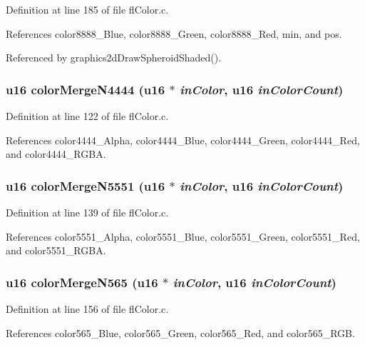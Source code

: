 Definition at line 185 of file fl\-Color.c.

References color8888\_\-Blue, color8888\_\-Green, color8888\_\-Red, min, and pos.

Referenced by graphics2d\-Draw\-Spheroid\-Shaded().
\subsubsection{\setlength{\rightskip}{0pt plus 5cm}u16 color\-Merge\-N4444 (u16 $\ast$ {\em in\-Color}, u16 {\em in\-Color\-Count})}\label{flColor_8c_9061458880496c59dbb038847f691c21}




Definition at line 122 of file fl\-Color.c.

References color4444\_\-Alpha, color4444\_\-Blue, color4444\_\-Green, color4444\_\-Red, and color4444\_\-RGBA.
\subsubsection{\setlength{\rightskip}{0pt plus 5cm}u16 color\-Merge\-N5551 (u16 $\ast$ {\em in\-Color}, u16 {\em in\-Color\-Count})}\label{flColor_8c_bb41f344d97f285f6e39ae0e931e3b80}




Definition at line 139 of file fl\-Color.c.

References color5551\_\-Alpha, color5551\_\-Blue, color5551\_\-Green, color5551\_\-Red, and color5551\_\-RGBA.
\subsubsection{\setlength{\rightskip}{0pt plus 5cm}u16 color\-Merge\-N565 (u16 $\ast$ {\em in\-Color}, u16 {\em in\-Color\-Count})}\label{flColor_8c_7aa019d179d856b74f3c50b1bd0187a5}




Definition at line 156 of file fl\-Color.c.

References color565\_\-Blue, color565\_\-Green, color565\_\-Red, and color565\_\-RGB.
